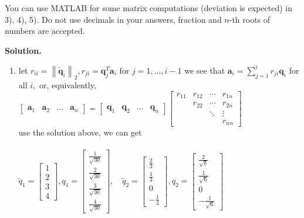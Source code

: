 \documentclass[english,onecolumn]{IEEEtran}
\begin{document}
 You can use MATLAB for some matrix computations (deviation is expected) in 3), 4), 5).
Do not use decimals in your answers, fraction and $n$-th roots of numbers are accepted.

\noindent
\textbf{Solution.}
\begin{enumerate}
\item 
let $r_{i i}=\left\|\tilde{\mathbf{q}}_{i}\right\|_{2}, r_{j i}=\mathbf{q}_{j}^{T} \mathbf{a}_{i}$ for $j=1, \ldots, i-1$
we see that $\mathbf{a}_{i}=\sum_{j=1}^{i} r_{j i} \mathbf{q}_{i}$ for all $i,$ or, equivalently,
$\left[\begin{array}{llll}\mathbf{a}_{1} & \mathbf{a}_{2} & \ldots & \mathbf{a}_{n}\end{array}\right]=\left[\begin{array}{llll}\mathbf{q}_{1} & \mathbf{q}_{2} & \ldots & \mathbf{q}_{n}\end{array}\right]\left[\begin{array}{llll}r_{11} & r_{12} & \cdots & r_{1 n} \\ & r_{22} & \cdots & r_{2 n} \\ & & \ddots & \vdots \\ & & & r_{n n}\end{array}\right]$\\
use the solution above, we can get \\\\
$\tilde{q}_{1}=\left[\begin{array}{l}1 \\ 2 \\ 3 \\ 4\end{array}\right], q_{1}=\left[\begin{array}{c}\frac{1}{\sqrt{30}} \\ \frac{2}{\sqrt{30}} \\ \frac{3}{\sqrt{30}} \\ \frac{4}{\sqrt{30}}\end{array}\right], \quad \tilde{q}_{2}=\left[\begin{array}{c}\frac{2}{3} \\ \frac{1}{3} \\ 0 \\ -\frac{1}{3}\end{array}\right], q_{2}=\left[\begin{array}{c}\frac{2}{\sqrt{b}} \\ \frac{1}{\sqrt{6}} \\ 0 \\ -\frac{1}{\sqrt{6}}\end{array}\right]$

\end{enumerate}
\end{document}
